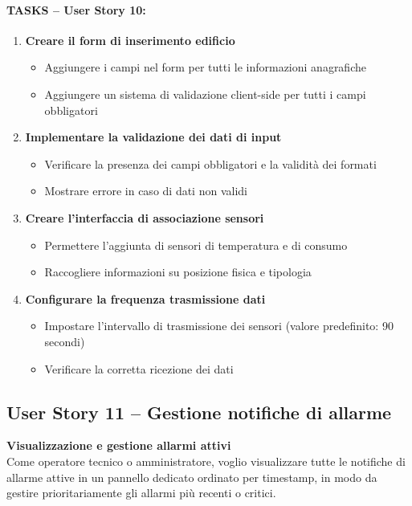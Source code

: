 \paragraph*{TASKS – User Story 10:}
\begin{enumerate}
    \item \textbf{Creare il form di inserimento edificio}
    \begin{itemize}
        \item Aggiungere i campi nel form per tutti le informazioni anagrafiche
        \item Aggiungere un sistema di validazione client-side per tutti i campi obbligatori
    \end{itemize}
    \item \textbf{Implementare la validazione dei dati di input}
    \begin{itemize}
        \item Verificare la presenza dei campi obbligatori e la validità dei formati
        \item Mostrare errore in caso di dati non validi
    \end{itemize}
    \item \textbf{Creare l'interfaccia di associazione sensori}
    \begin{itemize}
        \item Permettere l'aggiunta di sensori di temperatura e di consumo
        \item Raccogliere informazioni su posizione fisica e tipologia
    \end{itemize}
    \item \textbf{Configurare la frequenza trasmissione dati}
    \begin{itemize}
        \item Impostare l'intervallo di trasmissione dei sensori (valore predefinito: 90 secondi)
        \item Verificare la corretta ricezione dei dati
    \end{itemize}
\end{enumerate}


\subsection{User Story 11 – Gestione notifiche di allarme}
\label{us:notificheAllarme}

\textbf{Visualizzazione e gestione allarmi attivi} \\
Come operatore tecnico o amministratore, voglio visualizzare tutte le notifiche di allarme attive in un pannello dedicato ordinato per timestamp, in modo da gestire prioritariamente gli allarmi più recenti o critici.

